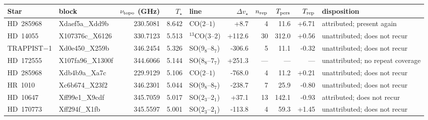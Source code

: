 \begin{tabular}{@{}l@{~}l@{~}r@{~}r@{~}l@{~}r@{~~}r@{~}r@{~}r@{~}l@{}}
\hline
Star & block & $\nu_{\rm topo}$ (GHz) & $T_\star$ & line & $\Delta v_\star$ & $n_{\rm rep}$ & $T_{\rm pers}$ & $T_{\rm rep}$ & disposition \\
\hline
HD~285968 & Xdaef5a\_Xdd9b & 230.5081 & 8.642 & CO($2$--$1$) & +8.7 & 4 & 11.6 & +6.71 & attributed; present again \\
HD~14055 & X107376c\_X6126 & 330.7123 & 5.513 & $^{13}$CO($3$--$2$) & +112.6 & 30 & 312.0 & +0.56 & unattributed; does not recur \\
TRAPPIST$-$1 & Xd0e450\_X259b & 346.2454 & 5.326 & SO($9_{8}$--$8_{7}$) & -306.6 & 5 & 11.1 & -0.32 & unattributed; does not recur \\
HD~172555 & X107fa96\_X1300f & 344.6066 & 5.144 & SO($8_{8}$--$7_{7}$) & +251.3 & --- & --- & --- & unattributed; no repeat coverage \\
HD~285968 & Xdb4b9a\_Xa7c & 229.9129 & 5.106 & CO($2$--$1$) & -768.0 & 4 & 11.2 & +0.21 & unattributed; does not recur \\
HR~1010 & Xc6b674\_X23f2 & 346.2301 & 5.044 & SO($9_{8}$--$8_{7}$) & -238.7 & 7 & 25.9 & -0.80 & unattributed; does not recur \\
HD~10647 & Xff99e1\_X9cdf & 345.7059 & 5.017 & SO($2_{3}$--$2_{1}$) & +37.1 & 13 & 142.1 & -0.93 & attributed; does not recur \\
HD~170773 & Xff294f\_X1fb & 345.5597 & 5.001 & SO($2_{3}$--$2_{1}$) & -113.8 & 4 & 59.3 & +1.45 & unattributed; does not recur \\
\hline
\end{tabular}
